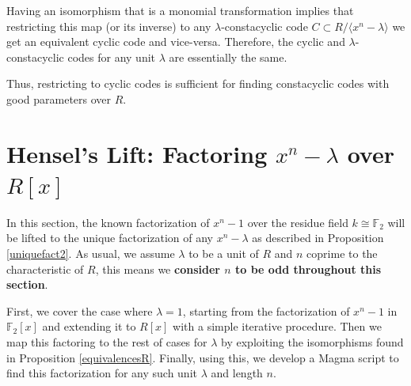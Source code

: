 \documentclass[a4paper, 12pt]{amsart}
\newtheorem{theorem}[lemma]{Theorem}
\theoremstyle{definition}
\newcommand{\F}{{\mathbb F}}
\newcommand{\lm}{\lambda}
\numberwithin{equation}{section}
\numberwithin{table}{section}
\begin{document}




Having an isomorphism that is a monomial transformation implies that restricting this map (or its inverse) to any $\lm$-constacyclic code $C \subset R/\langle x^n - \lm \rangle$ we get an equivalent cyclic code and vice-versa. Therefore, the cyclic and $\lm$-constacyclic codes for any unit $\lm$ are essentially the same.

Thus, restricting to cyclic codes is sufficient for finding constacyclic codes with good parameters over 
$R$.


\section{Hensel's Lift: Factoring $x^n- \lm$ over $R[x]$}\label{lifting}

In this section, the known factorization of $x^n-1$ over the residue field $k\cong \F_2$ will be lifted to the unique factorization of any $x^n-\lm$ as described in Proposition \ref{uniquefact2}. As usual, we assume $\lm$ to be a unit of $R$ and $n$ coprime to the characteristic of $R$, this means we \textbf{consider $n$ to be odd throughout this section}.

First, we cover the case where $\lm = 1$, starting from the factorization of $x^n-1$ in $\F_2[x]$ and extending it to $R[x]$ with a simple iterative procedure. Then we map this factoring to the rest of cases for $\lm$ by exploiting the isomorphisms found in Proposition \ref{equivalencesR}. Finally, using this, we develop a Magma script to find this factorization for any such unit $\lm$ and length $n$.
\end{document}

